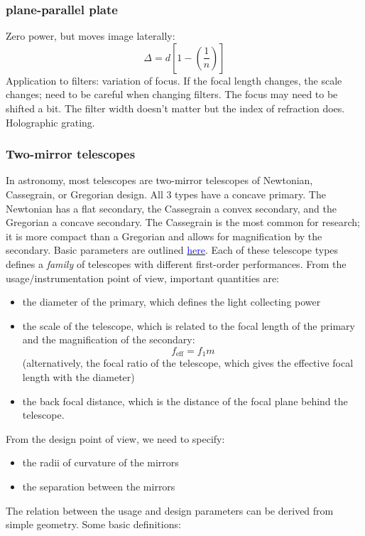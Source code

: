 \documentclass[12pt]{article}
\begin{document}
\subsubsection{plane-parallel plate}
Zero power, but moves image laterally:{$$
    \Delta = d\left[1-\left(\frac{1}{n}\right)\right]
$$}Application to filters: variation of focus. If the focal length
changes, the scale changes; need to be careful when changing filters.
The focus may need to be shifted a bit. The filter width doesn't matter
but the index of refraction does. Holographic grating.
\subsubsection{Two-mirror telescopes}
In astronomy, most telescopes are two-mirror telescopes of Newtonian,
Cassegrain, or Gregorian design. All 3 types have a concave primary.
The Newtonian has a flat secondary, the Cassegrain a convex secondary,
and the Gregorian a concave secondary. The Cassegrain is the most
common for research; it is more compact than a Gregorian and
allows for magnification by the secondary. Basic parameters are
outlined \href{%
http://astronomy.nmsu.edu/holtz/a535/html/diagrams/a535/cassegra.htm}{%
    \textcolor{blue}{here}}.
Each of these telescope types defines a \emph{family} of
telescopes with different first-order performances. From the
usage/instrumentation point of view, important quantities are:
\begin{itemize}
    \item the diameter of the primary, which defines the light
        collecting power
    \item the scale of the telescope, which is related to the focal
        length of the primary and the magnification of the secondary:{$$
            f_{\textrm{eff}} = f_{1}m
        $$}(alternatively, the focal ratio of the telescope, which gives
        the effective focal length with the diameter)
    \item the back focal distance, which is the distance of the focal
        plane behind the telescope.
\end{itemize}
From the design point of view, we need to specify:
\begin{itemize}
    \item the radii of curvature of the mirrors
    \item the separation between the mirrors
\end{itemize}
The relation between the usage and design parameters can be derived
from simple geometry. Some basic definitions:
\end{document}

